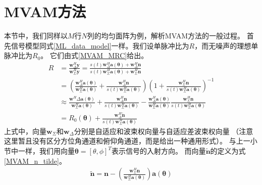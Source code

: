\documentclass[master]{thesis-uestc}
\begin{document}
\section{MVAM方法}
本节中，我们同样以$M$行$N$列的均匀面阵为例，解析MVAM方法的一般过程。
首先信号模型同式\eqref{ML_data_model}一样。我们设单脉冲比为$R$，而无噪声的理想单脉冲比为$R_0$。
它们由式\eqref{MVAM_MRC}给出。
\begin{equation}\label{MVAM_MRC}
    \begin{aligned}
        R &= \frac{\bm{w}^H_\Delta\bm{y}}{\bm{w}^H_\Sigma\bm{y}}
        = \frac{s(t)\bm{w}^H_\Delta\bm{a}(\bm{\theta}) + \bm{w}^H_\Delta\bm{n}}
               {s(t)\bm{w}^H_\Sigma\bm{a}(\bm{\theta}) + \bm{w}^H_\Sigma\bm{n}} \\
        &= \left(
                \frac{\bm{w}^H_\Delta\bm{a}(\bm{\theta})}{\bm{w}^H_\Sigma\bm{a}(\bm{\theta})} + 
                \frac{\bm{w}^H_\Delta\bm{n}}{s(t)\bm{w}^H_\Sigma\bm{a}(\bm{\theta})}
           \right)
           \left(1 + \frac{\bm{w}^H_\Sigma\bm{n}}{s(t)\bm{w}^H_\Sigma\bm{a}(\bm{\theta})}\right)^{-1} \\
        &\approx \frac{\bm{w}^H\Delta\bm{a}(\bm{\theta})}{\bm{w}^H_\Sigma\bm{a}(\bm{\theta})} + 
                 \frac{\bm{w}^H_\Delta\bm{n}}{s(t)\bm{w}^H_\Sigma\bm{a}(\bm{\theta})} - 
                 \frac{\bm{w}^H_\Delta\bm{a}(\bm{\theta})}{\bm{w}^H_\Sigma\bm{a}(\bm{\theta})}
                 \frac{\bm{w}^H_\Sigma\bm{n}}{s(t)\bm{w}^H_\Sigma\bm{a}(\bm{\theta})} \\
        &= R_0(\bm{\theta}) + \frac{\bm{w}^H_\Delta\tilde{\bm{n}}}{s(t)\bm{w}^H_\Sigma\bm{a}(\bm{\theta})}
    \end{aligned}
\end{equation}
上式中，向量$\bm{w}_\Sigma$和$\bm{w}_\Delta$分别是自适应和波束权向量与自适应差波束权向量
（注意这里暂且没有区分方位角通道和俯仰角通道，而是给出一种通用形式）。
与上一小节中一样，我们用向量$\bm{\theta}=\left[\theta,\phi\right]^T$表示信号的入射方向。
而向量$\tilde{\bm{n}}$的定义为式\eqref{MVAM_n_tilde}。
\begin{equation}\label{MVAM_n_tilde}
    \begin{aligned}
        \tilde{\bm{n}} = \bm{n} - 
        \left(\frac{\bm{w}^H_\Sigma\bm{n}}{\bm{w}^H_\Sigma\bm{a}(\bm{\theta})}\right)\bm{a}(\bm{\theta})
    \end{aligned}
\end{equation}
\end{document}
